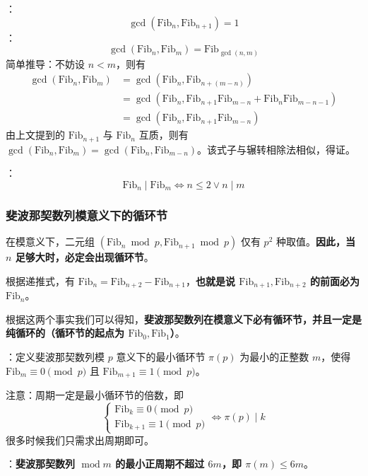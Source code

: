 ：
\[
\gcd(\mathrm{Fib}_n, \mathrm{Fib}_{n + 1}) = 1
\]
：
\[
\gcd(\mathrm{Fib}_n, \mathrm{Fib}_m) = \mathrm{Fib}_{\gcd(n, m)}
\]
简单推导：不妨设 $n < m$，则有
\[
\begin{aligned}
\gcd(\mathrm{Fib}_n, \mathrm{Fib}_m) & = \gcd(\mathrm{Fib}_n, \mathrm{Fib}_{n + (m - n)}) \\
& = \gcd(\mathrm{Fib}_n, \mathrm{Fib}_{n + 1}\mathrm{Fib}_{m - n} + \mathrm{Fib}_n\mathrm{Fib}_{m - n - 1}) \\
& = \gcd(\mathrm{Fib}_n, \mathrm{Fib}_{n + 1}\mathrm{Fib}_{m - n})
\end{aligned}
\]
由上文提到的 $\mathrm{Fib}_{n + 1}$ 与 $\mathrm{Fib}_n$ 互质，则有 $\gcd(\mathrm{Fib}_n, \mathrm{Fib}_m) = \gcd(\mathrm{Fib}_n, \mathrm{Fib}_{m - n})$。该式子与辗转相除法相似，得证。

：
\[
\mathrm{Fib}_n \mid \mathrm{Fib}_m \iff n \leq 2 \lor n \mid m
\]

\subsubsection{斐波那契数列模意义下的循环节}

在模意义下，二元组 $(\mathrm{Fib}_n \bmod p, \mathrm{Fib}_{n + 1} \bmod p)$ 仅有 $p^2$ 种取值。\textbf{因此，当 $n$ 足够大时，必定会出现循环节}。

根据递推式，有 $\mathrm{Fib}_n = \mathrm{Fib}_{n + 2} - \mathrm{Fib}_{n + 1}$，\textbf{也就是说 $\mathrm{Fib}_{n + 1}, \mathrm{Fib}_{n + 2}$ 的前面必为 $\mathrm{Fib}_n$}。

根据这两个事实我们可以得知，\textbf{斐波那契数列在模意义下必有循环节，并且一定是纯循环的（循环节的起点为 $\mathrm{Fib}_0, \mathrm{Fib}_1$）}。

：定义斐波那契数列模 $p$ 意义下的最小循环节 $\pi(p)$ 为最小的正整数 $m$，使得 $\mathrm{Fib}_m \equiv 0 \pmod p$ 且 $\mathrm{Fib}_{m + 1} \equiv 1 \pmod p$。

注意：周期一定是最小循环节的倍数，即
\[
\begin{cases} \mathrm{Fib}_k \equiv 0 \pmod p \\ \mathrm{Fib}_{k + 1} \equiv 1 \pmod p \end{cases} \iff \pi(p) \mid k
\]
很多时候我们只需求出周期即可。

：\textbf{斐波那契数列 $\operatorname{mod} m$ 的最小正周期不超过 $6m$，即 $\pi(m) \leq 6m$}。

